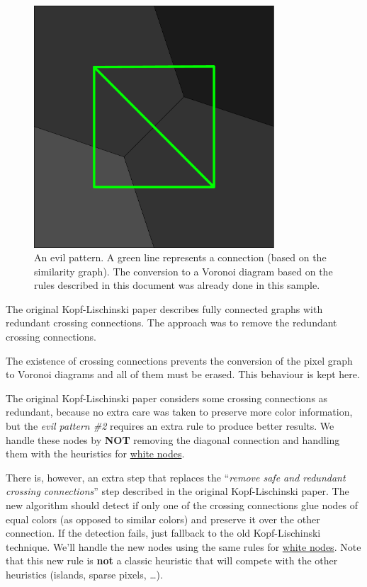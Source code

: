 \begin{figure}[H]
  \centering
  \includegraphics[width=0.8\textwidth]{assets/evil_pattern2.pdf}
  \caption{An evil pattern. A green line represents a connection (based on the
    similarity graph). The conversion to a Voronoi diagram based on the rules
    described in this document was already done in this sample.}
\end{figure}

The original Kopf-Lischinski paper describes fully connected graphs with
redundant crossing connections. The approach was to remove the redundant
crossing connections.

The existence of crossing connections prevents the conversion of the pixel graph
to Voronoi diagrams and all of them must be erased. This behaviour is kept here.

The original Kopf-Lischinski paper considers some crossing connections as
redundant, because no extra care was taken to preserve more color information,
but the \emph{evil pattern \#2} requires an extra rule to produce better
results. We handle these nodes by \textbf{NOT} removing the diagonal connection
and handling them with the heuristics for \hyperref[white_nodes]{white nodes}.

There is, however, an extra step that replaces the ``\emph{remove safe and
redundant crossing connections}'' step described in the original Kopf-Lischinski
paper. The new algorithm should detect if only one of the crossing connections
glue nodes of equal colors (as opposed to similar colors) and preserve it over
the other connection. If the detection fails, just fallback to the old
Kopf-Lischinski technique. We'll handle the new nodes using the same rules for
\hyperref[white_nodes]{white nodes}. Note that this new rule is \textbf{not} a
classic heuristic that will compete with the other heuristics (islands, sparse
pixels, \ldots{}).


